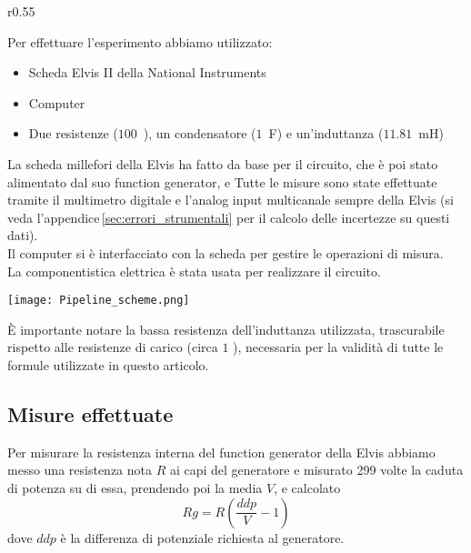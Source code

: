 \documentclass[../Relazione_circuiti]{subfiles}
\begin{document}
\begin{wrapfigure}{r}{0.55\textwidth}

\end{wrapfigure}

\begin{minipage}{.44\textwidth}

  Per effettuare l'esperimento abbiamo utilizzato:
  \begin{itemize}
    \item Scheda Elvis II della National Instruments
    \item Computer
    \item Due resistenze ($100$~\textOmega), un condensatore ($1$~\textmu F) e un'induttanza ($11.81$~mH)
  \end{itemize}

  La scheda millefori della Elvis ha fatto da base per il circuito, che è poi stato alimentato dal suo function
  generator, e Tutte le misure sono state effettuate tramite il multimetro digitale e l'analog input multicanale sempre
  della Elvis (si veda l'appendice\,\ref{sec:errori_strumentali} per il calcolo delle incertezze su questi dati).\\
  Il computer si è interfacciato con la scheda per gestire le operazioni di misura. \\
  La componentistica elettrica è stata usata per realizzare il circuito.
\end{minipage}
\hfill
\begin{minipage}{0.55\textwidth}
  \centering
  \texttt{[image: Pipeline\_scheme.png]}
\end{minipage}
È importante notare la bassa resistenza dell'induttanza utilizzata, trascurabile rispetto alle resistenze di carico
(circa $1$ \textOmega), necessaria per la validità di tutte le formule utilizzate in questo articolo.

\subsection{Misure effettuate}\label{subsec:misure-effettuate}

  Per misurare la resistenza interna del function generator della Elvis abbiamo messo una resistenza nota $R$ ai capi
  del generatore e misurato 299 volte la caduta di potenza su di essa, prendendo poi la media $V$, e calcolato
  \begin{equation*}
    Rg = R \left( \frac{ddp}{V} - 1 \right)
  \end{equation*}
  dove $ddp$ è la differenza di potenziale richiesta al generatore. \\
\end{document}
